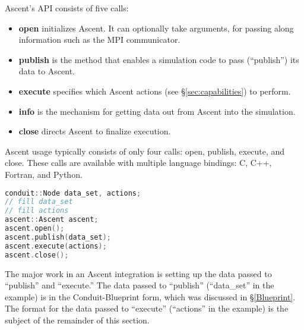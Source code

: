%

Ascent's API consists of five calls:
%
\begin{itemize}
  \item \textbf{open} initializes Ascent.  It can optionally take arguments, for passing along
information such as the MPI communicator.
%
  \item \textbf{publish} is the method that enables a simulation code to pass (``publish'') its data
to Ascent.  
%
   \item \textbf{execute} specifies which Ascent actions (see \S\ref{sec:capabilities}) to perform.  
%
%
  \item \textbf{info} is the mechanism for getting data out from Ascent into the simulation.
%
%
  \item \textbf{close} directs Ascent to finalize execution.
\end{itemize}

Ascent usage typically consists of only four calls: open, publish, execute, and close.
%
These calls are available with multiple language bindings: C, C++, Fortran, and Python.
%
%
\begin{lstlisting}[language=C++,caption={\label{listing:ascent_api}Typical Ascent usage in C++.
The code for ``fill data\_set'' can be found in Listing~\ref{ex:blueprint}, while the code
for ``fill actions'' can be found in Listing~\ref{listing:actions}.}]
conduit::Node data_set, actions;
// fill data_set 
// fill actions 
ascent::Ascent ascent;
ascent.open();
ascent.publish(data_set);
ascent.execute(actions);
ascent.close();
\end{lstlisting}

The major work in an Ascent integration is setting up the data passed to ``publish'' and
``execute.''
%
The data passed to ``publish'' (``data\_set'' in the example) is in the Conduit-Blueprint form, which was discussed in \S\ref{Blueprint}.
%
The format for the data passed to ``execute'' (``actions'' in the example) 
is the subject of the remainder of this section.
%


